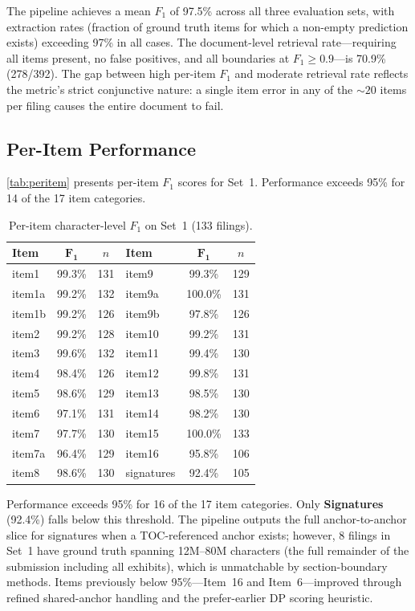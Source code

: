 \documentclass[12pt,letterpaper,oneside]{article}
\begin{document}
The pipeline achieves a mean $F_1$ of 97.5\% across all three
evaluation sets, with extraction rates (fraction of ground truth
items for which a non-empty prediction exists) exceeding 97\% in
all cases. The document-level retrieval rate---requiring all items
present, no false positives, and all boundaries at $F_1 \geq
0.9$---is 70.9\% (278/392). The gap between high per-item $F_1$
and moderate retrieval rate reflects the metric's strict
conjunctive nature: a single item error in any of the ${\sim}20$
items per filing causes the entire document to fail.

\subsection{Per-Item Performance}

\autoref{tab:peritem} presents per-item $F_1$ scores for Set~1.
Performance exceeds 95\% for 14 of the 17 item categories.

\begin{table}[htbp]
\centering
\caption{Per-item character-level $F_1$ on Set~1 (133 filings).}\label{tab:peritem}
\begin{tabu}{lcc|lcc}
\toprule
\textbf{Item} & $\bm{F_1}$ & \textbf{$n$} & \textbf{Item} & $\bm{F_1}$ & \textbf{$n$} \\
\midrule
item1       & 99.3\% & 131 & item9    & 99.3\% & 129 \\
item1a      & 99.2\% & 132 & item9a   & 100.0\% & 131 \\
item1b      & 99.2\% & 126 & item9b   & 97.8\% & 126 \\
item2       & 99.2\% & 128 & item10   & 99.2\% & 131 \\
item3       & 99.6\% & 132 & item11   & 99.4\% & 130 \\
item4       & 98.4\% & 126 & item12   & 99.8\% & 131 \\
item5       & 98.6\% & 129 & item13   & 98.5\% & 130 \\
item6       & 97.1\% & 131 & item14   & 98.2\% & 130 \\
item7       & 97.7\% & 130 & item15   & 100.0\% & 133 \\
item7a      & 96.4\% & 129 & item16   & 95.8\% & 106 \\
item8       & 98.6\% & 130 & signatures & 92.4\% & 105 \\
\bottomrule
\end{tabu}
\end{table}

Performance exceeds 95\% for 16 of the 17 item categories.
Only \textbf{Signatures} (92.4\%) falls below this threshold.
The pipeline outputs the full anchor-to-anchor slice for
signatures when a TOC-referenced anchor exists; however, 8 filings
in Set~1 have ground truth spanning 12M--80M characters (the
full remainder of the submission including all exhibits), which
is unmatchable by section-boundary methods. Items previously
below 95\%---Item~16 and Item~6---improved through refined
shared-anchor handling and the prefer-earlier DP scoring heuristic.
\end{document}
